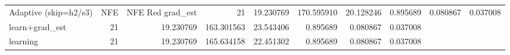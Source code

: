 \begin{tabular}{lrrrrrrr}
\toprule
Adaptive (skip=h2/s3) & NFE & NFE Red %
\midrule
grad_est & 21 & 19.230769 & 170.595910 & 20.128246 & 0.895689 & 0.080867 & 0.037008 \\
learn+grad_est & 21 & 19.230769 & 163.301563 & 23.543406 & 0.895689 & 0.080867 & 0.037008 \\
learning & 21 & 19.230769 & 165.634158 & 22.451302 & 0.895689 & 0.080867 & 0.037008 \\
\bottomrule
\end{tabular}
